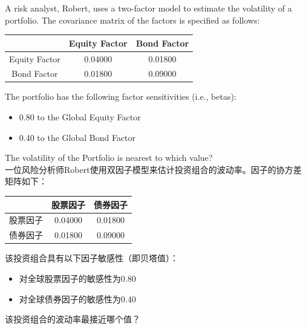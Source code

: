\documentclass{article}
\newcounter{question} %
\begin{document}
\begin{question}
    A risk analyst, Robert, uses a two-factor model to estimate the volatility of a portfolio. The covariance matrix of the factors is specified as follows:

    \begin{table}[h]
        \centering
        \begin{tabular}{|c|c|c|}
            \hline
            & Equity Factor & Bond Factor \\
            \hline
            Equity Factor & 0.04000 & 0.01800 \\
            \hline
            Bond Factor & 0.01800 & 0.09000 \\
            \hline
        \end{tabular}
    \end{table}

    The portfolio has the following factor sensitivities (i.e., betas):
    \begin{itemize}
        \item 0.80 to the Global Equity Factor
        \item 0.40 to the Global Bond Factor
    \end{itemize}

    The volatility of the Portfolio is nearest to which value?
    \\    一位风险分析师Robert使用双因子模型来估计投资组合的波动率。因子的协方差矩阵如下：

    \begin{table}[h]
        \centering
        \begin{tabular}{|c|c|c|}
            \hline
            & 股票因子 & 债券因子 \\
            \hline
            股票因子 & 0.04000 & 0.01800 \\
            \hline
            债券因子 & 0.01800 & 0.09000 \\
            \hline
        \end{tabular}
    \end{table}

    该投资组合具有以下因子敏感性（即贝塔值）：
    \begin{itemize}
        \item 对全球股票因子的敏感性为0.80
        \item 对全球债券因子的敏感性为0.40
    \end{itemize}

    该投资组合的波动率最接近哪个值？
\end{question}
\end{document}
